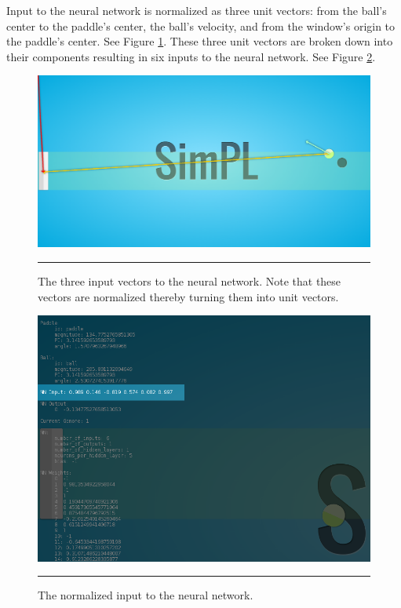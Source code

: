 Input to the neural network is normalized as three unit vectors: from the ball's center to the paddle's center, the ball's velocity, and from the window's origin to the paddle's center. See Figure \ref{fig:unit_vectors}. These three unit vectors are broken down into their components resulting in six inputs to the neural network. See Figure \ref{fig:nn_input}. 

\begin{figure}[htbp]  
  \centering
  \includegraphics[scale=0.21]{../Figures/Chapter3/unit_vectors.png}
  \rule{35em}{0.5pt}
  \caption[SimPL NN Input Vectors]{The three input vectors to the neural network. Note that these vectors are normalized thereby turning them into unit vectors.}
  \label{fig:unit_vectors}
\end{figure}

\begin{figure}[htbp]  
  \centering
  \includegraphics[scale=0.5]{../Figures/Chapter3/nn_input.png}
  \rule{35em}{0.5pt}
  \caption[SimPL NN Input Tuple]{The normalized input to the neural network.}
  \label{fig:nn_input}
\end{figure}

